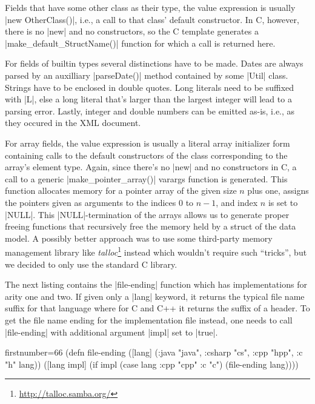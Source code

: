 \documentclass[a4paper]{article}
\newcommand{\code}{\clojureinline}
\begin{document}
Fields that have some other class as their type, the value expression is
usually \code|new OtherClass()|, i.e., a call to that class' default
constructor.  In C, however, there is no \code|new| and no constructors, so the
C template generates a \code|make_default_StructName()| function for which a
call is returned here.

For fields of builtin types several distinctions have to be made.  Dates are
always parsed by an auxilliary \code|parseDate()| method contained by some
\code|Util| class.  Strings have to be enclosed in double quotes.  Long
literals need to be suffixed with \code|L|, else a long literal that's larger
than the largest integer will lead to a parsing error.  Lastly, integer and
double numbers can be emitted as-is, i.e., as they occured in the XML document.

For array fields, the value expression is usually a literal array initializer
form containing calls to the default constructors of the class corresponding to
the array's element type.  Again, since there's no \code|new| and no
constructors in C, a call to a generic \code|make_pointer_array()| varargs
function is generated.  This function allocates memory for a pointer array of
the given size \(n\)
plus one, assigns the pointers given as arguments to the indices \(0\)
to \(n-1\),
and index \(n\)
is set to \cinline|NULL|.  This \cinline|NULL|-termination of the arrays allows
us to generate proper freeing functions that recursively free the memory held
by a struct of the data model.  A possibly better approach was to use some
third-party memory management library like
\emph{talloc}\footnote{\url{http://talloc.samba.org/}} instead which wouldn't
require such ``tricks'', but we decided to only use the standard C library.

The next listing contains the \code|file-ending| function which has
implementations for arity one and two.  If given only a \code|lang| keyword, it
returns the typical file name suffix for that language where for C and C++ it
returns the suffix of a header.  To get the file name ending for the
implementation file instead, one needs to call \code|file-ending| with
additional argument \code|impl| set to \code|true|.

\begin{clojurecode*}{firstnumber=66}
(defn file-ending
  ([lang] ({:java "java", :csharp "cs", :cpp "hpp", :c "h"} lang))
  ([lang impl]
     (if impl
       (case lang :cpp "cpp" :c "c")
       (file-ending lang))))
\end{clojurecode*}
\end{document}

